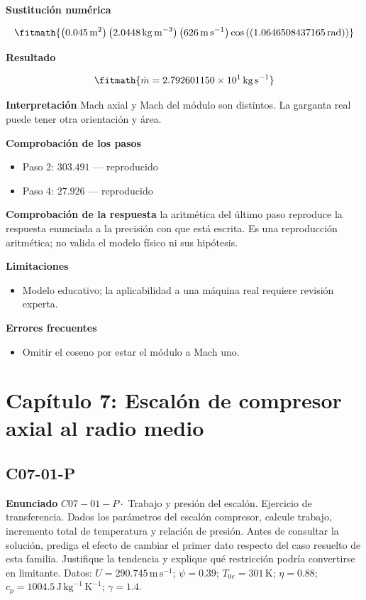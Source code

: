 \documentclass[10pt,openany]{book}
\begin{document}
\noindent\textbf{Sustitución numérica}

\[
\fitmath{\left(0.045\,\mathrm{m}^{2}\right) \left(2.0448\,\mathrm{kg}\,\mathrm{m}^{-3}\right) \left(626\,\mathrm{m}\,\mathrm{s}^{-1}\right) \cos{\left(\left(1.0646508437165\,\mathrm{rad}\right) \right)}}
\]

\noindent\textbf{Resultado}

\[
\fitmath{\dot m=2.792601150\times10^{1}\,\mathrm{kg}\,\mathrm{s}^{-1}}
\]

\noindent\textbf{Interpretación}
Mach axial y Mach del módulo son distintos. La garganta real puede tener otra orientación y área.

\noindent\textbf{Comprobación de los pasos}
\begin{itemize}
\item Paso 2: $303.491$ — reproducido
\item Paso 4: $27.926$ — reproducido
\end{itemize}

\noindent\textbf{Comprobación de la respuesta} la aritmética del último paso reproduce la respuesta enunciada a la precisión con que está escrita. Es una reproducción aritmética; no valida el modelo físico ni sus hipótesis.

\noindent\textbf{Limitaciones}
\begin{itemize}
\item Modelo educativo; la aplicabilidad a una máquina real requiere revisión experta.
\end{itemize}

\noindent\textbf{Errores frecuentes}
\begin{itemize}
\item Omitir el coseno por estar el módulo a Mach uno.
\end{itemize}
\section{Capítulo 7: Escalón de compresor axial al radio medio}
\subsection*{C07-01-P}

\noindent\textbf{Enunciado}
\(C07-01-P \cdot\) Trabajo y presión del escalón. Ejercicio de transferencia. Dados los parámetros del escalón compresor, calcule trabajo, incremento total de temperatura y relación de presión. Antes de consultar la solución, prediga el efecto de cambiar el primer dato respecto del caso resuelto de esta familia. Justifique la tendencia y explique qué restricción podría convertirse en limitante. Datos: \(U=290.745\, \mathrm{m}\,\mathrm{s}^{-1}\); \(\psi=0.39\); \(T_{0e}=301\, \mathrm{K}\); \(\eta=0.88\); \(c_p=1004.5\, \mathrm{J}\,\mathrm{kg}^{-1}\,\mathrm{K}^{-1}\); \(\gamma=1.4\).
\end{document}

